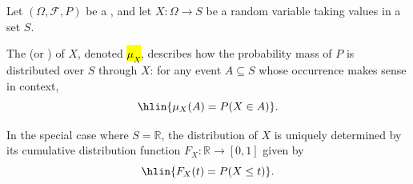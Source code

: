 \begin{definition} \label{definition:distribution_of_a_random_variable_on_a_probability_space}
Let $(\Omega, \mathcal{F}, P)$ be a , and let $X : \Omega \to S$ be a random variable taking values in a set $S$.

The  (or ) of $X$, denoted \hl{$\mu_X$}, describes how the probability mass of $P$ is distributed over $S$ through $X$: for any event $A \subseteq S$ whose occurrence makes sense in context,
$$\hlin{\mu_X(A) = P(X \in A)}.$$

In the special case where $S = \mathbb{R}$, the distribution of $X$ is uniquely determined by its cumulative distribution function $F_X : \mathbb{R} \to [0, 1]$ given by
$$\hlin{F_X(t) = P(X \leq t)}.$$
\end{definition}

